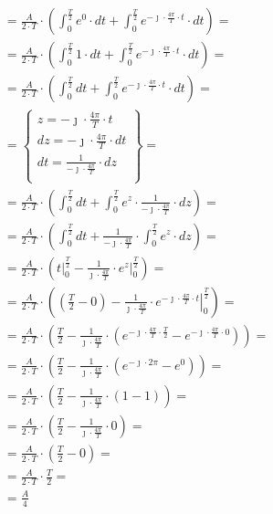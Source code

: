 \begin{task}
\begin{align*}
&=\frac{A}{2\cdot T}\cdot \left( \int_{0}^{\frac{T}{2}} e^{0} \cdot dt + \int_{0}^{\frac{T}{2}} e^{-\jmath \cdot \frac{4\pi}{T} \cdot t } \cdot dt \right)=\\
&=\frac{A}{2\cdot T}\cdot \left( \int_{0}^{\frac{T}{2}} 1 \cdot dt + \int_{0}^{\frac{T}{2}} e^{-\jmath \cdot \frac{4\pi}{T} \cdot t } \cdot dt \right)=\\
&=\frac{A}{2\cdot T}\cdot \left( \int_{0}^{\frac{T}{2}} dt + \int_{0}^{\frac{T}{2}} e^{-\jmath \cdot \frac{4\pi}{T} \cdot t } \cdot dt \right)=\\
&=\begin{Bmatrix}
z=-\jmath \cdot \frac{4\pi}{T} \cdot t \\
dz=-\jmath \cdot \frac{4\pi}{T} \cdot dt \\
dt=\frac{1}{-\jmath \cdot \frac{4\pi}{T}} \cdot dz \\
\end{Bmatrix}=\\
&=\frac{A}{2\cdot T}\cdot \left( \int_{0}^{\frac{T}{2}} dt + \int_{0}^{\frac{T}{2}} e^{z } \cdot \frac{1}{-\jmath \cdot \frac{4\pi}{T}}\cdot dz \right)=\\
&=\frac{A}{2\cdot T}\cdot \left( \int_{0}^{\frac{T}{2}} dt + \frac{1}{-\jmath \cdot \frac{4\pi}{T}}\cdot \int_{0}^{\frac{T}{2}} e^{z} \cdot dz \right)=\\
&=\frac{A}{2\cdot T}\cdot \left( \left. t \right|_{0}^{\frac{T}{2}} - \frac{1}{\jmath \cdot \frac{4\pi}{T}}\cdot \left. e^{z} \right|_{0}^{\frac{T}{2}} \right)=\\
&=\frac{A}{2\cdot T}\cdot \left( \left( \frac{T}{2} - 0 \right) - \frac{1}{\jmath \cdot \frac{4\pi}{T}}\cdot \left. e^{-\jmath \cdot \frac{4\pi}{T} \cdot t} \right|_{0}^{\frac{T}{2}} \right)=\\
&=\frac{A}{2\cdot T}\cdot \left( \frac{T}{2} - \frac{1}{\jmath \cdot \frac{4\pi}{T}}\cdot \left(e^{-\jmath \cdot \frac{4\pi}{T} \cdot \frac{T}{2}}  - e^{-\jmath \cdot \frac{4\pi}{T} \cdot 0}\right) \right)=\\
&=\frac{A}{2\cdot T}\cdot \left( \frac{T}{2} - \frac{1}{\jmath \cdot \frac{4\pi}{T}}\cdot \left(e^{-\jmath \cdot 2\pi}  - e^{0}\right) \right)=\\
&=\frac{A}{2\cdot T}\cdot \left( \frac{T}{2} - \frac{1}{\jmath \cdot \frac{4\pi}{T}}\cdot \left(1  - 1\right) \right)=\\
&=\frac{A}{2\cdot T}\cdot \left( \frac{T}{2} - \frac{1}{\jmath \cdot \frac{4\pi}{T}}\cdot 0 \right)=\\
&=\frac{A}{2\cdot T}\cdot \left( \frac{T}{2} - 0 \right)=\\
&=\frac{A}{2\cdot T}\cdot \frac{T}{2}=\\
&=\frac{A}{4}
\end{align*}


\end{task}
